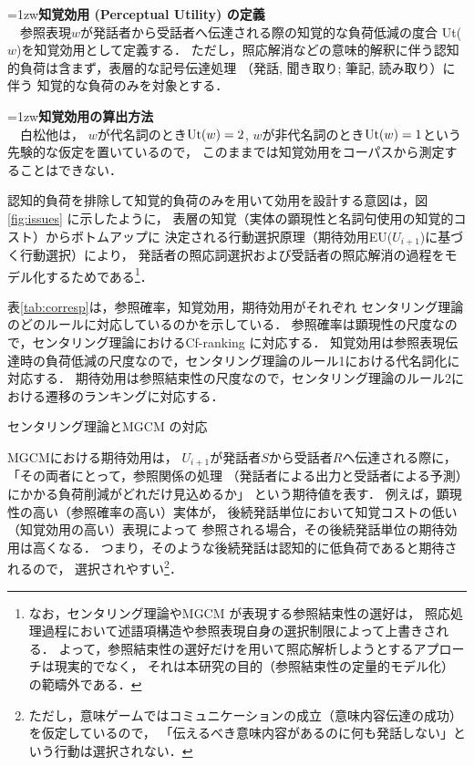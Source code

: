 \documentclass[japanese]{jnlp_1.3e}
\begin{document}
    \par\noindent{}\hangindent=1zw\textbf{知覚効用 (Perceptual Utility) の定義}\\
　参照表現$w$が発話者から受話者へ伝達される際の知覚的な負荷低減の度合 Ut($w$)を知覚効用として定義する．
ただし，照応解消などの意味的解釈に伴う認知的負荷は含まず，表層的な記号伝達処理
（発話, 聞き取り; 筆記, 読み取り）に伴う
知覚的な負荷のみを対象とする．
    \par\noindent{}\hangindent=1zw\textbf{知覚効用の算出方法}\\
　白松他\citeyear{siramatu2005nlp}は，
$w$が代名詞のとき${\rm Ut}(w)=2$, $w$が非代名詞のとき${\rm Ut}(w)=1$という先験的な仮定を置いているので，
このままでは知覚効用をコーパスから測定することはできない．


\noindent
認知的負荷を排除して知覚的負荷のみを用いて効用を設計する意図は，図\ref{fig:issues} に示したように，
表層の知覚（実体の顕現性と名詞句使用の知覚的コスト）からボトムアップに
決定される行動選択原理（期待効用EU($U_{i+1}$)に基づく行動選択）により，
発話者の照応詞選択および受話者の照応解消の過程をモデル化するためである\footnote{
	なお，センタリング理論やMGCM が表現する参照結束性の選好は，
照応処理過程において述語項構造や参照表現自身の選択制限によって上書きされる．
よって，参照結束性の選好だけを用いて照応解析しようとするアプローチは現実的でなく，
それは本研究の目的（参照結束性の定量的モデル化）の範疇外である．}．



表\ref{tab:corresp}は，参照確率，知覚効用，期待効用がそれぞれ
センタリング理論のどのルールに対応しているのかを示している．
参照確率は顕現性の尺度なので，センタリング理論におけるCf-ranking に対応する．
知覚効用は参照表現伝達時の負荷低減の尺度なので，センタリング理論のルール1における代名詞化に対応する．
期待効用は参照結束性の尺度なので，センタリング理論のルール2における遷移のランキングに対応する．

\begin{table}[t]
\begin{center}
\caption{センタリング理論とMGCM の対応}
\label{tab:corresp}

\end{center}
\end{table}


MGCMにおける期待効用は，
$U_{i+1}$が発話者$S$から受話者$R$へ伝達される際に，
「その両者にとって，参照関係の処理 
（発話者による出力と受話者による予測）にかかる負荷削減がどれだけ見込めるか」
という期待値を表す．
例えば，顕現性の高い（参照確率の高い）実体が，
後続発話単位において知覚コストの低い（知覚効用の高い）表現によって
参照される場合，その後続発話単位の期待効用は高くなる．
つまり，そのような後続発話は認知的に低負荷であると期待されるので，
選択されやすい\footnote{
ただし，意味ゲームではコミュニケーションの成立（意味内容伝達の成功）を仮定しているので，
「伝えるべき意味内容があるのに何も発話しない」という行動は選択されない．}．
\end{document}
